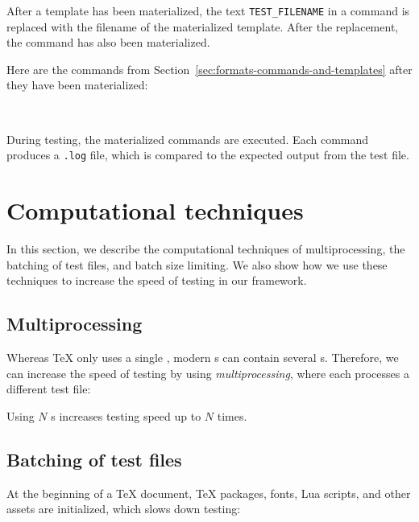 \documentclass[final]{ltugboat}
\begin{document}
\smallskip
\exampleSeparator

\smallskip
\noindent
{}

\smallskip

After a template has been materialized, the text \texttt{TEST\_FILENAME} in a command is replaced with the filename of the materialized template. After the replacement, the command has also been materialized.

Here are the commands  from Section~\ref{sec:formats-commands-and-templates} after they have been materialized:

\smallskip
\noindent
{} \\[0.8em]

\smallskip

\noindent
During testing, the materialized commands are executed. Each command produces a \texttt{.log} file, which is compared to the expected output from the test file.

\section{Computational techniques}
\label{sec:computational-techniques}

In this section, we describe the computational techniques of multiprocessing, the batching of test files, and batch size limiting. We also show how we use these techniques to increase the speed of testing in our framework.

\subsection{Multiprocessing}
\label{sec:multiprocessing}
Whereas \TeX{} only uses a single , modern s can contain several s. Therefore, we can increase the speed of testing by using \emph{multiprocessing}, where each  processes a different test file:

\smallskip
\noindent
\begingroup
\centering

\par
\endgroup

\smallskip
\noindent
Using $N$ s increases testing speed up to $N$ times.

\subsection{Batching of test files}
\label{sec:batching-of-test-files}
At the beginning of a \TeX{} document, \TeX{} packages, fonts, Lua scripts, and other assets are initialized, which slows down testing:
\end{document}
